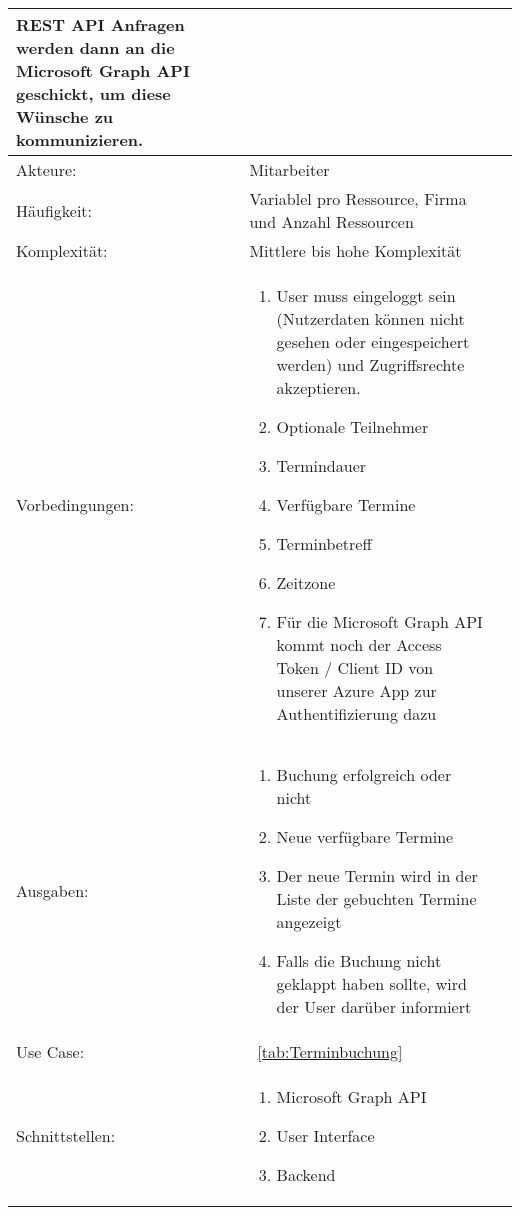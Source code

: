 \begin{tabularx}{\textwidth\footnotesize}{|l*{2}{|X}|}
    REST API Anfragen werden dann an die Microsoft Graph API geschickt, um diese Wünsche zu kommunizieren.\\
    \hline
    Akteure: & Mitarbeiter\\
    \hline
    Häufigkeit: & Variablel pro Ressource, Firma und Anzahl Ressourcen\\
    \hline
    Komplexität: & Mittlere bis hohe Komplexität\\
    \hline
    Vorbedingungen: & \begin{enumerate}
                          \item User muss eingeloggt sein (Nutzerdaten können nicht gesehen oder eingespeichert werden) und Zugriffsrechte akzeptieren.
                          \item Optionale Teilnehmer
                          \item Termindauer
                          \item Verfügbare Termine
                          \item Terminbetreff
                          \item Zeitzone
                          \item Für die Microsoft Graph API kommt noch der Access Token / Client ID von unserer Azure App zur Authentifizierung dazu
    \end{enumerate}\\
    \hline
    Ausgaben: & \begin{enumerate}
                    \item Buchung erfolgreich oder nicht
                    \item Neue verfügbare Termine
                    \item Der neue Termin wird in der Liste der gebuchten Termine angezeigt
                    \item Falls die Buchung nicht geklappt haben sollte, wird der User darüber informiert
    \end{enumerate}\\
    \hline
    Use Case: &~\ref{tab:Terminbuchung}\\
    \hline
Schnittstellen: & \begin{enumerate}
                        \item Microsoft Graph API
                        \item User Interface
                        \item Backend
                      \end{enumerate}\\

\end{tabularx}
